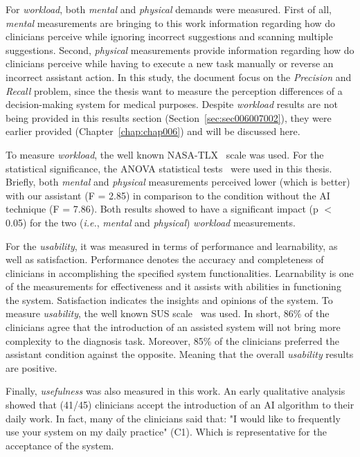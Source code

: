 For {\it workload}, both {\it mental} and {\it physical} demands were measured.
First of all, {\it mental} measurements are bringing to this work information regarding how do clinicians perceive while ignoring incorrect suggestions and scanning multiple suggestions.
Second, {\it physical} measurements provide information regarding how do clinicians perceive while having to execute a new task manually or reverse an incorrect assistant action.
In this study, the document focus on the {\it Precision} and {\it Recall} problem, since the thesis want to measure the perception differences of a decision-making system for medical purposes.
Despite {\it workload} results are not being provided in this results section (Section~\ref{sec:sec006007002}), they were earlier provided (Chapter~\ref{chap:chap006}) and will be discussed here.

To measure {\it workload}, the well known \ac{NASA-TLX}~\cite{ramkumar2017using, grier2015high} scale was used.
For the statistical significance, the \ac{ANOVA} statistical tests\footnotemark[5]~\cite{Wobbrock:2011:ART:1978942.1978963, mathews2017usability} were used in this thesis.
Briefly, both {\it mental} and {\it physical} measurements perceived lower (which is better) with our assistant (F = 2.85) in comparison to the condition without the AI technique (F = 7.86).
Both results showed to have a significant impact (p $<$ 0.05) for the two ({\it i.e.}, {\it mental} and {\it physical}) {\it workload} measurements.

For the {\it usability}, it was measured in terms of performance and learnability, as well as satisfaction.
Performance denotes the accuracy and completeness of clinicians in accomplishing the specified system functionalities.
Learnability is one of the measurements for effectiveness and it assists with abilities in functioning the system.
Satisfaction indicates the insights and opinions of the system.
To measure {\it usability}, the well known \ac{SUS} scale~\cite{ramkumar2017using, grier2015high} was used.
In short, 86\% of the clinicians agree that the introduction of an assisted system will not bring more complexity to the diagnosis task.
Moreover, 85\% of the clinicians preferred the assistant condition against the opposite.
Meaning that the overall {\it usability} results are positive.

Finally, {\it usefulness} was also measured in this work.
An early qualitative analysis showed that (41/45) clinicians accept the introduction of an \ac{AI} algorithm to their daily work.
In fact, many of the clinicians said that: "I would like to frequently use your system on my daily practice" (C1).
Which is representative for the acceptance of the system.

